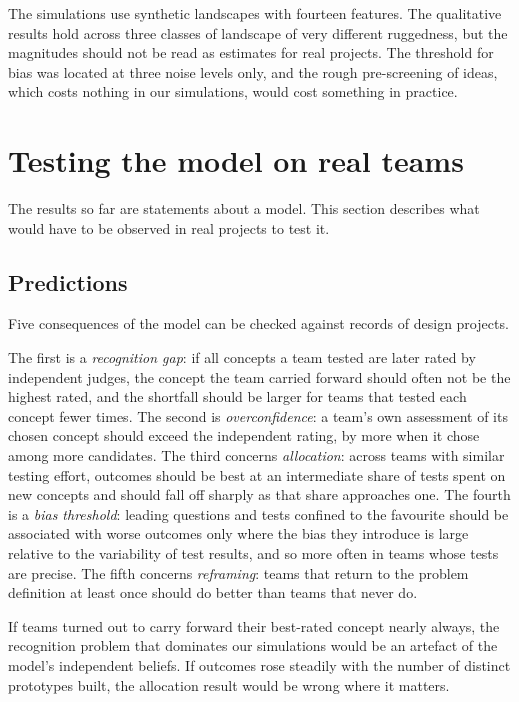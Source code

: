 \documentclass[10pt,twocolumn]{article}
\theoremstyle{definition}
\begin{document}
The simulations use synthetic landscapes with fourteen features. The qualitative results hold across three classes of landscape of very different ruggedness, but the magnitudes should not be read as estimates for real projects. The threshold for bias was located at three noise levels only, and the rough pre-screening of ideas, which costs nothing in our simulations, would cost something in practice.

\section{Testing the model on real teams}
\label{sec:empirical}

The results so far are statements about a model. This section describes what would have to be observed in real projects to test it.

\subsection{Predictions}

Five consequences of the model can be checked against records of design projects.

The first is a \emph{recognition gap}: if all concepts a team tested are later rated by independent judges, the concept the team carried forward should often not be the highest rated, and the shortfall should be larger for teams that tested each concept fewer times. The second is \emph{overconfidence}: a team's own assessment of its chosen concept should exceed the independent rating, by more when it chose among more candidates. The third concerns \emph{allocation}: across teams with similar testing effort, outcomes should be best at an intermediate share of tests spent on new concepts and should fall off sharply as that share approaches one. The fourth is a \emph{bias threshold}: leading questions and tests confined to the favourite should be associated with worse outcomes only where the bias they introduce is large relative to the variability of test results, and so more often in teams whose tests are precise. The fifth concerns \emph{reframing}: teams that return to the problem definition at least once should do better than teams that never do.

If teams turned out to carry forward their best-rated concept nearly always, the recognition problem that dominates our simulations would be an artefact of the model's independent beliefs. If outcomes rose steadily with the number of distinct prototypes built, the allocation result would be wrong where it matters.
\end{document}
